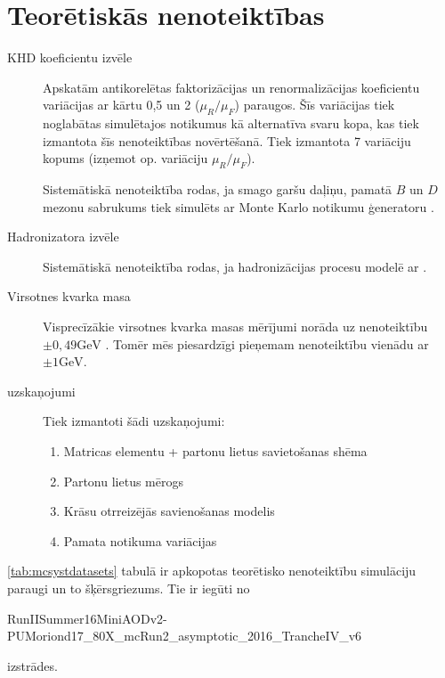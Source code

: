 \section{Teorētiskās nenoteiktības}
\begin{description}
\item[KHD koeficientu izvēle] Apskatām antikorelētas faktorizācijas un renormalizācijas koeficientu variācijas ar kārtu 0,5 un 2 ($\mu_R/\mu_F$) \ttbar paraugos. Šīs variācijas tiek noglabātas simulētajos notikumus kā alternatīva svaru kopa, kas tiek izmantota šīs nenoteiktības novērtēšanā. Tiek izmantota 7 variāciju kopums (izņemot op. variāciju $\mu_R/\mu_F$).
\item[\EVTGEN] Sistemātiskā nenoteiktība rodas, ja smago garšu daļiņu, pamatā $B$ un $D$ mezonu sabrukums tiek simulēts ar Monte Karlo notikumu ģeneratoru \EVTGEN.
\item[Hadronizatora izvēle] Sistemātiskā nenoteiktība rodas, ja hadronizācijas procesu modelē ar \HERWIGpp. 
\item[Virsotnes kvarka masa] Visprecīzākie virsotnes kvarka masas mērījumi norāda uz nenoteiktību $\pm 0,49 \text{GeV}$ \cite{Khachatryan:2015hba}. Tomēr mēs piesardzīgi pieņemam nenoteiktību vienādu ar $\pm 1 \text{GeV}$. 
\item[\PYTHIA uzskaņojumi] Tiek izmantoti šādi \PYTHIA uzskaņojumi:
  \begin{enumerate}
  \item Matricas elementu + partonu lietus savietošanas shēma 
  \item Partonu lietus mērogs 
  \item Krāsu otrreizējās savienošanas modelis 
  \item Pamata notikuma variācijas 
  \end{enumerate}
\end{description}

\ref{tab:mcsystdatasets} tabulā ir apkopotas teorētisko nenoteiktību simulāciju paraugi un to šķērsgriezums. Tie ir iegūti no

RunIISummer16MiniAODv2-PUMoriond17\_80X\_mcRun2\_asymptotic\_2016\_TrancheIV\_v6

izstrādes.

